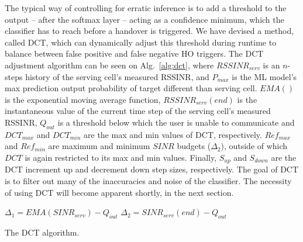 			The typical way of controlling for erratic inference is to add a threshold to the output -- after the softmax layer -- acting as a confidence minimum, which the classifier has to reach before a handover is triggered.
			We have devised a method, called \ac{DCT}, which can dynamically adjust this threshold during runtime to balance between false positive and false negative \ac{HO} triggers.			
			The \ac{DCT} adjustment algorithm can be seen on Alg.~\ref{alg:dct}, where $RSSINR_{serv}$ is an $n$-steps history of the serving cell's measured \ac{RSSINR}, and $P_{max}$ is the \ac{ML} model’s max prediction output probability of target different than serving cell.
			$EMA()$ is the exponential moving average function, $RSSINR_{serv}(end)$ is the instantaneous value of the current time step of the serving cell's measured \ac{RSSINR}, $Q_{out}$ is a threshold below which the user is unable to communicate and $DCT_{max}$ and $DCT_{min}$ are the max and min values of \ac{DCT}, respectively.
			$Ref_{max}$ and $Ref_{min}$ are maximum and minimum $SINR$ budgets ($\Delta_2$), outside of which $DCT$ is again restricted to its max and min values.
			Finally, $S_{up}$ and $S_{down}$ are the \ac{DCT} increment up and decrement down step sizes, respectively.		
			The goal of \ac{DCT} is to filter out many of the inaccuracies and noise of the classifier.
			The necessity of using \ac{DCT} will become apparent shortly, in the next section.
		
			\begin{algorithm}[ht]
				\SetAlgoLined
				
				$\Delta_1 = EMA(SINR_{serv}) - Q_{out}$\;
				$\Delta_2 = SINR_{serv}(end) - Q_{out}$\;
		
				\caption[DCT]{The DCT algorithm.}
				\label{alg:dct}			
			\end{algorithm}
		
